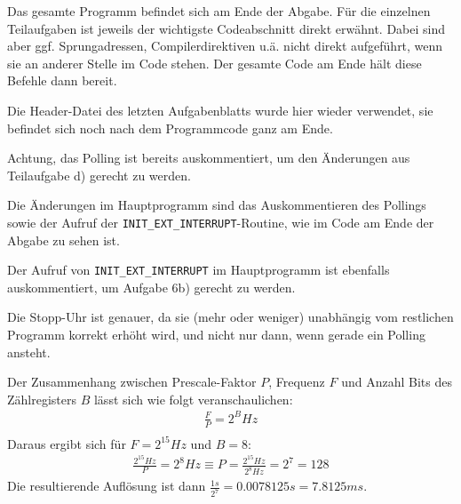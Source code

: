 \documentclass{CInf_practice}
\begin{document}
\cinftitle

Das gesamte Programm befindet sich am Ende der Abgabe.
Für die einzelnen Teilaufgaben ist jeweils der wichtigste Codeabschnitt
direkt erwähnt. Dabei sind aber ggf. Sprungadressen, Compilerdirektiven u.ä.
nicht direkt aufgeführt, wenn sie an anderer Stelle im Code stehen. Der gesamte
Code am Ende hält diese Befehle dann bereit.

Die Header-Datei des letzten Aufgabenblatts wurde hier wieder verwendet, sie 
befindet sich noch nach dem Programmcode ganz am Ende.













Achtung, das Polling ist bereits auskommentiert, um den Änderungen aus 
Teilaufgabe d) gerecht zu werden.







Die Änderungen im Hauptprogramm sind das Auskommentieren des Pollings sowie
der Aufruf der \texttt{INIT\_EXT\_INTERRUPT}-Routine, wie im Code am Ende der 
Abgabe zu sehen ist.

Der Aufruf von \texttt{INIT\_EXT\_INTERRUPT} im Hauptprogramm ist ebenfalls 
auskommentiert, um Aufgabe 6b) gerecht zu werden.



Die Stopp-Uhr ist genauer, da sie (mehr oder weniger) unabhängig vom 
restlichen Programm korrekt erhöht wird, und nicht nur dann, wenn gerade ein 
Polling ansteht.

Der Zusammenhang zwischen Prescale-Faktor $P$, Frequenz $F$ und Anzahl Bits 
des Zählregisters $B$ lässt sich wie folgt veranschaulichen:
\begin{align*}
\frac{F}{P} = 2^B Hz\\
\end{align*}
Daraus ergibt sich für $F = 2^{15} Hz$ und $B = 8$:
\begin{align*}
\frac{2^{15} Hz}{P} = 2^8 Hz \equiv P = \frac{2^{15} Hz}{2^8 Hz} = 2^7 = 128
\end{align*}
Die resultierende Auflösung ist dann $\frac{1 s}{2^7} = 0.0078125 s = 7.8125 ms$.
\end{document}

